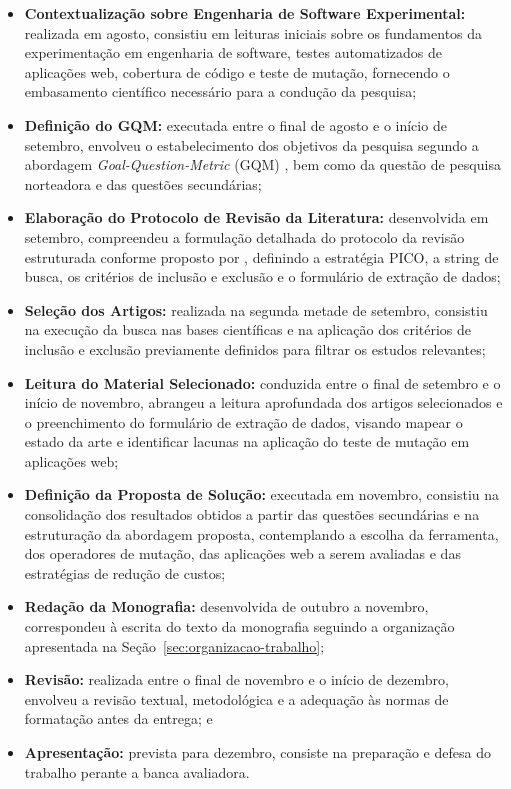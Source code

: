 \begin{itemize}[
    noitemsep,
    topsep=3pt,
    parsep=0pt,
    partopsep=0pt,
    leftmargin=1.25cm
]
    \item \textbf{Contextualização sobre Engenharia de Software Experimental:} realizada em agosto, consistiu em leituras iniciais sobre os fundamentos da experimentação em engenharia de software, testes automatizados de aplicações web, cobertura de código e teste de mutação, fornecendo o embasamento científico necessário para a condução da pesquisa;

    \item \textbf{Definição do GQM:} executada entre o final de agosto e o início de setembro, envolveu o estabelecimento dos objetivos da pesquisa segundo a abordagem \textit{Goal-Question-Metric} (GQM) \cite{basili1994}, bem como da questão de pesquisa norteadora e das questões secundárias;

    \item \textbf{Elaboração do Protocolo de Revisão da Literatura:} desenvolvida em setembro, compreendeu a formulação detalhada do protocolo da revisão estruturada conforme proposto por , definindo a estratégia PICO, a string de busca, os critérios de inclusão e exclusão e o formulário de extração de dados;

    \item \textbf{Seleção dos Artigos:} realizada na segunda metade de setembro, consistiu na execução da busca nas bases científicas e na aplicação dos critérios de inclusão e exclusão previamente definidos para filtrar os estudos relevantes;

    \item \textbf{Leitura do Material Selecionado:} conduzida entre o final de setembro e o início de novembro, abrangeu a leitura aprofundada dos artigos selecionados e o preenchimento do formulário de extração de dados, visando mapear o estado da arte e identificar lacunas na aplicação do teste de mutação em aplicações web;

    \item \textbf{Definição da Proposta de Solução:} executada em novembro, consistiu na consolidação dos resultados obtidos a partir das questões secundárias e na estruturação da abordagem proposta, contemplando a escolha da ferramenta, dos operadores de mutação, das aplicações web a serem avaliadas e das estratégias de redução de custos;

    \item \textbf{Redação da Monografia:} desenvolvida de outubro a novembro, correspondeu à escrita do texto da monografia seguindo a organização apresentada na Seção~\ref{sec:organizacao-trabalho};

    \item \textbf{Revisão:} realizada entre o final de novembro e o início de dezembro, envolveu a revisão textual, metodológica e a adequação às normas de formatação antes da entrega; e

    \item \textbf{Apresentação:} prevista para dezembro, consiste na preparação e defesa do trabalho perante a banca avaliadora.
\end{itemize}

